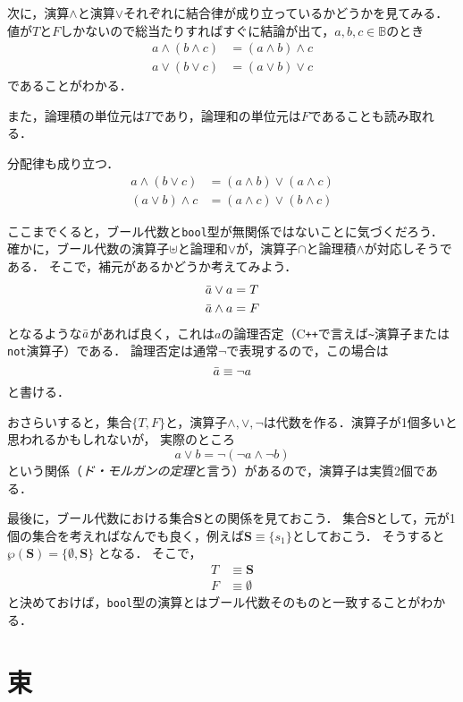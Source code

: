 \documentclass{jsbook}
\newcommand{\cxx}{\textrm{C}\texttt{++}}
\newcommand{\ccode}[1]{\texttt{#1}}
\newcommand{\keyword}[1]{\emph{#1}}
\newcommand{\bg}[1]{\mathbf{#1}}
\begin{document}
次に，演算$\wedge$と演算$\vee$それぞれに結合律が成り立っているかどうかを見てみる．
値が$T$と$F$しかないので総当たりすればすぐに結論が出て，$a,b,c\in\mathbb{B}$のとき
\begin{align}
a\wedge(b\wedge c)&=(a\wedge b)\wedge c\\
a\vee(b\vee c)&=(a\vee b)\vee c
\end{align}
であることがわかる．

また，論理積の単位元は$T$であり，論理和の単位元は$F$であることも読み取れる．

分配律も成り立つ．
\begin{align}
a\wedge(b\vee c)&=(a\wedge b)\vee(a\wedge c)\\
(a\vee b)\wedge c&=(a\wedge c)\vee(b\wedge c)
\end{align}

ここまでくると，ブール代数と\ccode{bool}型が無関係ではないことに気づくだろう．
確かに，ブール代数の演算子$\uplus$と論理和$\vee$が，演算子$\cap$と論理積$\wedge$が対応しそうである．
そこで，補元があるかどうか考えてみよう．
\begin{align}
\Bar{a}\vee a&=T\\
\Bar{a}\wedge a&=F
\end{align}
となるような$\Bar{a}$があれば良く，これは$a$の論理否定（\cxx で言えば\verb|~|演算子または\ccode{not}演算子）である．
論理否定は通常$\neg$で表現するので，この場合は
\begin{equation}
\Bar{a}\equiv\neg a
\end{equation}
と書ける．

おさらいすると，集合$\{T,F\}$と，演算子$\wedge,\vee,\neg$は代数を作る．演算子が1個多いと思われるかもしれないが，
実際のところ
\begin{equation}
a\vee b=\neg(\neg a\wedge\neg b)
\end{equation}
という関係（\keyword{ド・モルガンの定理}と言う）があるので，演算子は実質2個である．

最後に，ブール代数における集合$\bg{S}$との関係を見ておこう．
集合$\bg{S}$として，元が1個の集合を考えればなんでも良く，例えば$\bg{S}\equiv\{s_1\}$としておこう．
そうすると $\wp(\bg{S})=\{\emptyset,\bg{S}\}$ となる．
そこで，
\begin{align}
T&\equiv\bg{S}\\
F&\equiv\emptyset
\end{align}
と決めておけば，\ccode{bool}型の演算とはブール代数そのものと一致することがわかる．

\section{束}
\end{document}

